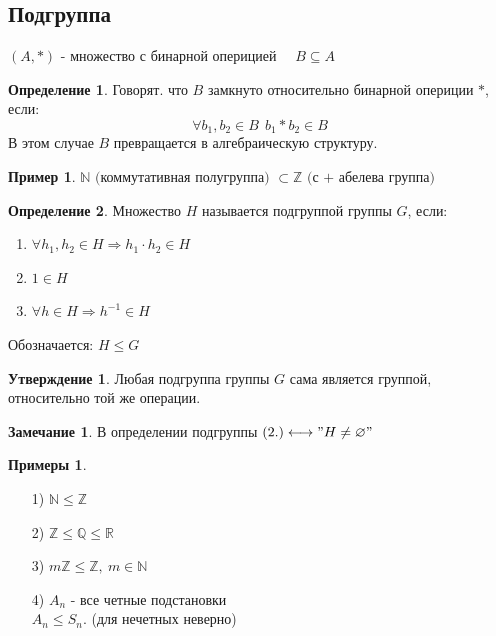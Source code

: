 \documentclass[a4paper, 12pt]{article}
\newcommand{\R}{\mathbb R}
\newcommand{\Q}{\mathbb Q}
\newcommand{\Z}{\mathbb Z}
\newcommand{\N}{\mathbb N}
\newcommand\tab[1][.5cm]{\hspace*{#1}}
\theoremstyle{definition}
\newtheorem*{definition}{Определение}
\newtheorem*{subtheorem}{Утверждение}
\newtheorem*{remark}{Замечание}
\newtheorem*{example}{Примеры}
\newtheorem*{example1}{Пример}
\begin{document}
  \subsection{Подгруппа}
  $(A,*)$ - множество с бинарной оперицией \ \ $B \subseteq A$ 
  \begin{definition}
    Говорят. что $B$ замкнуто относительно бинарной опериции $*$, если: $$\forall b_1,b_2 \in B \ \ b_1 * b_2 \in B$$
    В этом случае $B$ превращается в алгебраическую структуру.   
  \end{definition}  
  \begin{example1}
    $\N \text{ (коммутативная полугруппа) }  \subset \Z \text{ (с + абелева группа) }$ 
  \end{example1}
  \begin{definition}
    Множество $H$ называется подгруппой группы $G$, если:
    \begin{enumerate}
      \item $\forall h_1,h_2 \in H \Longrightarrow h_1 \cdot h_2 \in H$ 
      \item $\mathfrak{1} \in H$
      \item $\forall h \in H \Longrightarrow h^{-1} \in H$  
    \end{enumerate}
    Обозначается: $H\leq G$ 
  \end{definition} 
  \begin{subtheorem}
    Любая подгруппа группы $G$ сама является группой, относительно той же операции.
  \end{subtheorem} 
  \begin{remark}
    В определении подгруппы $(2.) \longleftrightarrow "H \neq \varnothing"$ 
  \end{remark} 
  \begin{example}\tab
    \begin{itemize}
      \item[1)] $\N\leq \Z$
      \item[2)] $\Z \leq \Q \leq \R$
      \item[3)] $m\Z \leq\Z, \ m\in \N$   
      \item[4)] $A_n$ - все четные подстановки\\
      $A_n \leq S_n$. (для нечетных неверно)    
    \end{itemize}
  \end{example}
\end{document}
